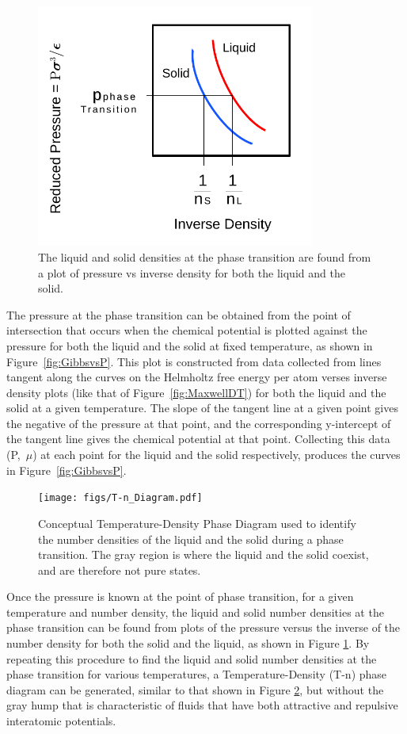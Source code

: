 \documentclass[double,12pt]{beavtex}
\begin{document}
\begin{figure}
    \centering
    \includegraphics[height=8cm]{figs/MaxwellDTC-Fig3.pdf}
    \caption{The liquid and solid densities at the phase transition are 
    found from a plot of pressure vs inverse density for both the liquid and the solid.}
    \label{fig:Pvsinvn}
  \end{figure}

The pressure at the phase transition can be obtained from the point of 
intersection that occurs when the chemical potential 
is plotted against the pressure for both the liquid and the 
solid at fixed temperature, as shown in Figure~\ref{fig:GibbsvsP}. 
This plot is constructed from data collected from lines tangent 
along the curves on the Helmholtz free energy per atom verses inverse 
density plots (like that of Figure~\ref{fig:MaxwellDT}) for both the 
liquid and the solid at a given temperature. 
The slope of the tangent line at a given point gives the negative of the 
pressure at that point, and the corresponding y-intercept of the tangent 
line gives the chemical potential at that point. Collecting this data 
(P,~$\mu$) at each point for the liquid and the solid respectively, 
produces the curves in Figure~\ref{fig:GibbsvsP}. 

\begin{figure}
    \centering
    \texttt{[image: figs/T-n\_Diagram.pdf]}
    \caption{Conceptual Temperature-Density Phase Diagram used to identify 
    the number densities of the liquid and the solid during a phase 
    transition. The gray region is where the liquid and the solid coexist, 
    and are therefore not pure states.}
    \label{fig:T-n_Diagram}
  \end{figure} 
  
Once the pressure is known at the point of phase transition, for a given 
temperature and number density, the liquid and solid number densities at 
the phase transition can be found from plots of the pressure versus the 
inverse of the number density for both the solid and the liquid, 
as shown in Figure \ref{fig:Pvsinvn}. By repeating this procedure to 
find the liquid and solid number densities at the phase transition 
for various temperatures, a Temperature-Density (T-n) phase diagram 
can be generated, similar to that shown in Figure \ref{fig:T-n_Diagram}, 
but without the gray hump that is characteristic of fluids that have 
both attractive and repulsive interatomic potentials. 
\end{document}
